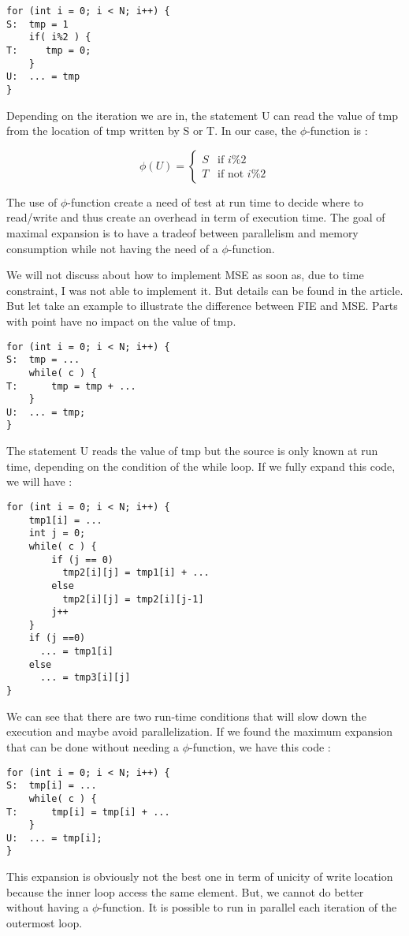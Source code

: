 \begin{lstlisting}[frame=single]
for (int i = 0; i < N; i++) {
S:  tmp = 1
    if( i%2 ) {
T:     tmp = 0;
    }
U:  ... = tmp
}
\end{lstlisting}

Depending on the iteration we are in, the statement U can read the value of tmp from the location of tmp written by S or T. In our case, the $\phi$-function is :

\[ \phi(U) = \begin{cases} 
      S & \text{if $i\%2$} \\
      T & \text{if not $i\%2$}
   \end{cases}
\]

The use of $\phi$-function create a need of test at run time to decide where to read/write and thus create an overhead in term of execution time. The goal of maximal expansion is to have a tradeof between parallelism and memory consumption while not having the need of a $\phi$-function. 

We will not discuss about how to implement \ac{MSE} as soon as, due to time constraint, I was not able to implement it. But details can be found in the article\cite{MSE}. But let take an example to illustrate the difference between \ac{FIE} and \ac{MSE}. Parts with point have no impact on the value of tmp.

\begin{lstlisting}[frame=single]
for (int i = 0; i < N; i++) {
S:  tmp = ...
    while( c ) {
T:      tmp = tmp + ...
    }
U:  ... = tmp;
}
\end{lstlisting}

The statement U reads the value of tmp but the source is only known at run time, depending on the condition of the while loop. If we fully expand this code, we will have :

\begin{lstlisting}[frame=single]
for (int i = 0; i < N; i++) {
    tmp1[i] = ...
    int j = 0;
    while( c ) {
        if (j == 0)
          tmp2[i][j] = tmp1[i] + ...
        else
          tmp2[i][j] = tmp2[i][j-1]
        j++
    }
    if (j ==0)
      ... = tmp1[i]
    else
      ... = tmp3[i][j]
}
\end{lstlisting}
We can see that there are two run-time conditions that will slow down the execution and maybe avoid parallelization. If we found the maximum expansion that can be done without needing a $\phi$-function, we have this code :

\begin{lstlisting}[frame=single]
for (int i = 0; i < N; i++) {
S:  tmp[i] = ...
    while( c ) {
T:      tmp[i] = tmp[i] + ...
    }
U:  ... = tmp[i];
}
\end{lstlisting}
This expansion is obviously not the best one in term of unicity of write location because the inner loop access the same element. But, we cannot do better without having a $\phi$-function. It is  possible to run in parallel each iteration of the outermost loop.
